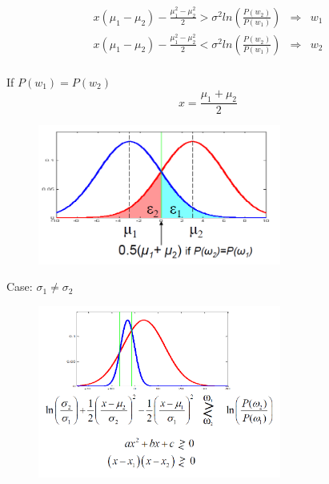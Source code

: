 \documentclass[letterpaper,10pt]{article}
\begin{document}
\begin{equation}
\begin{array}{rcl}
x(\mu_1-\mu_2) - \frac{\mu_1^2-\mu_2^2}{2} > \sigma^2 ln(\frac{P(w_2)}{P(w_1)}) & \Rightarrow & w_1 \\
x(\mu_1-\mu_2) - \frac{\mu_1^2-\mu_2^2}{2} < \sigma^2 ln(\frac{P(w_2)}{P(w_1)}) & \Rightarrow & w_2 \\
\end{array}
\end{equation}

If $P(w_1)=P(w_2)$
\begin{equation}
x = \frac{\mu_1+\mu_2}{2}
\end{equation}

\begin{figure}[!ht]
	\centering
	\includegraphics[width=8cm]{./img/gaussian_linear_classifier.png}
\end{figure}

Case: $\sigma_1\neq\sigma_2$

\begin{figure}[!ht]
	\centering
	\includegraphics[width=8cm]{./img/guassian_quadratic_classifier.png}
\end{figure}
\end{document}
